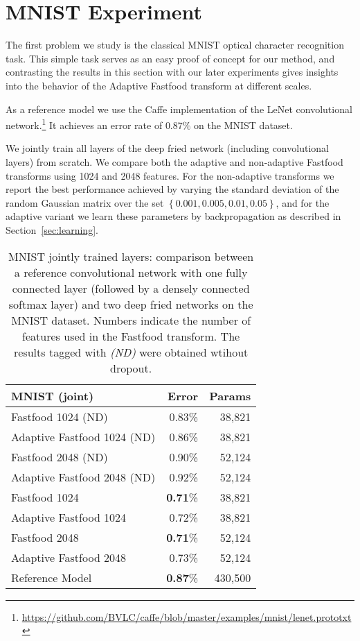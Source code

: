 \documentclass[10pt,twocolumn,letterpaper]{article}
\newcommand{\cbr}[1]{\left\{#1\right\}}
\begin{document}
\section{MNIST Experiment}

The first problem we study is the classical MNIST optical character recognition task.  This simple task serves as an easy proof of concept for our method, and contrasting the results in this section with our later experiments gives insights into the behavior of the Adaptive Fastfood transform at different scales.

As a reference model we use the Caffe implementation of the LeNet convolutional
network.\footnote{\url{https://github.com/BVLC/caffe/blob/master/examples/mnist/lenet.prototxt}}
It achieves an error rate of $0.87\%$ on the MNIST dataset.

We jointly train all layers of the deep fried network
(including convolutional layers) from scratch. We compare both the adaptive and non-adaptive Fastfood transforms using 1024 and 2048 features.  For the non-adaptive transforms we report the best performance achieved by varying the standard deviation of the random Gaussian matrix over the set $\cbr{0.001, 0.005, 0.01, 0.05}$, and for the adaptive variant we learn these parameters by backpropagation as described in Section~\ref{sec:learning}.

\begin{table}
  \centering
  \begin{tabular}{l|r|r}
    MNIST (joint) & Error & Params\\
    \hline
    Fastfood 1024 (ND) & 0.83\% & 38,821\\
    Adaptive Fastfood 1024 (ND) & 0.86\% &  38,821\\ Fastfood 2048 (ND) & 0.90\% & 52,124\\
    Adaptive Fastfood 2048 (ND) & 0.92\% &  52,124\\ \hline
    Fastfood 1024 & \textbf{0.71}\% &  38,821\\ Adaptive Fastfood 1024 & 0.72\% &  38,821\\ Fastfood 2048 & \textbf{0.71}\% &  52,124\\ Adaptive Fastfood 2048 & 0.73\% &  52,124\\ \hline
    Reference Model & \textbf{0.87}\% & 430,500
\end{tabular}
\caption{ MNIST jointly trained layers:
  comparison between a reference convolutional network with
  one fully connected layer (followed by a densely connected softmax layer) and two deep fried networks on the
  MNIST dataset.  Numbers indicate the number of features used in the Fastfood transform. The results tagged with \emph{(ND)} were obtained wtihout dropout.
}
\label{tab:mnist_joint}
\end{table}
\end{document}
